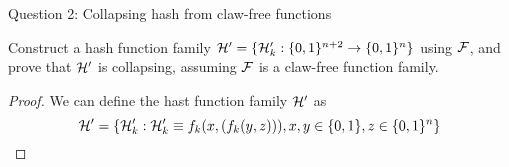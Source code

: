 \begin{solution}{Question 2: Collapsing hash from claw-free functions}\label{ques:x}
    \begin{question}
    Construct a hash function family $ \mathcal{H}' = \{\mathcal{H}'_k : \{0,1\}^{n+2} \rightarrow \{0,1\}^n \} $ using $\mathcal{F}$, and prove that $\mathcal{H}'$ is collapsing, assuming $\mathcal{F}$ is a claw-free function family.

    \end{question}
    \tcblower{}
    \begin{proof}
    We can define the hast function family $\mathcal{H}'$ as 
    \[\mathcal{H}' = \{\mathcal{H}'_k : \mathcal{H}'_k \equiv f_k(x,(f_k(y,z))), x,y \in \{0,1\}, z \in \{0,1\}^n \}\]

    
    \end{proof}
\end{solution}
